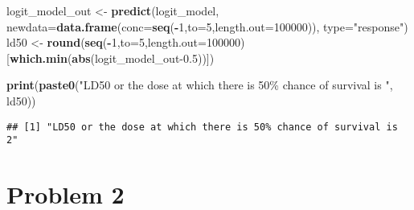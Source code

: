 \documentclass[
]{article}
\newenvironment{Shaded}{\begin{snugshade}}{\end{snugshade}}
\newcommand{\AttributeTok}[1]{\textcolor[rgb]{0.13,0.29,0.53}{#1}}
\newcommand{\DecValTok}[1]{\textcolor[rgb]{0.00,0.00,0.81}{#1}}
\newcommand{\FloatTok}[1]{\textcolor[rgb]{0.00,0.00,0.81}{#1}}
\newcommand{\FunctionTok}[1]{\textcolor[rgb]{0.13,0.29,0.53}{\textbf{#1}}}
\newcommand{\NormalTok}[1]{#1}
\newcommand{\OtherTok}[1]{\textcolor[rgb]{0.56,0.35,0.01}{#1}}
\newcommand{\SpecialCharTok}[1]{\textcolor[rgb]{0.81,0.36,0.00}{\textbf{#1}}}
\newcommand{\StringTok}[1]{\textcolor[rgb]{0.31,0.60,0.02}{#1}}
\begin{document}
\begin{Shaded}
\begin{Highlighting}[]
\NormalTok{logit\_model\_out }\OtherTok{\textless{}{-}} \FunctionTok{predict}\NormalTok{(logit\_model, }\AttributeTok{newdata=}\FunctionTok{data.frame}\NormalTok{(}\AttributeTok{conc=}\FunctionTok{seq}\NormalTok{(}\SpecialCharTok{{-}}\DecValTok{1}\NormalTok{,}\AttributeTok{to=}\DecValTok{5}\NormalTok{,}\AttributeTok{length.out=}\DecValTok{100000}\NormalTok{)), }\AttributeTok{type=}\StringTok{"response"}\NormalTok{)}
\NormalTok{ld50 }\OtherTok{\textless{}{-}} \FunctionTok{round}\NormalTok{(}\FunctionTok{seq}\NormalTok{(}\SpecialCharTok{{-}}\DecValTok{1}\NormalTok{,}\AttributeTok{to=}\DecValTok{5}\NormalTok{,}\AttributeTok{length.out=}\DecValTok{100000}\NormalTok{)[}\FunctionTok{which.min}\NormalTok{(}\FunctionTok{abs}\NormalTok{(logit\_model\_out}\FloatTok{{-}0.5}\NormalTok{))])}

\FunctionTok{print}\NormalTok{(}\FunctionTok{paste0}\NormalTok{(}\StringTok{"LD50 or the dose at which there is 50\% chance of survival is "}\NormalTok{, ld50))}
\end{Highlighting}
\end{Shaded}

\begin{verbatim}
## [1] "LD50 or the dose at which there is 50% chance of survival is 2"
\end{verbatim}

\section{Problem 2}\label{problem-2}


\end{document}
